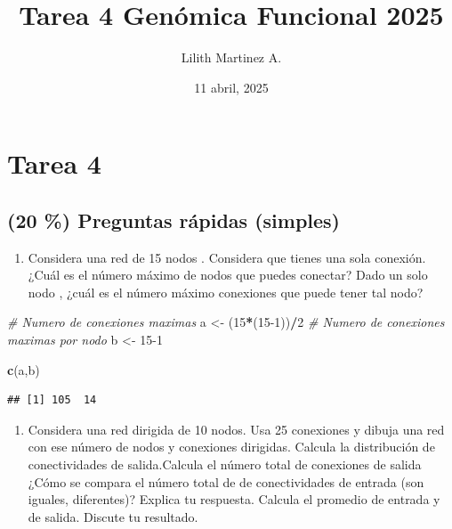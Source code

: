 \documentclass[
]{article}
\title{Tarea 4 Genómica Funcional 2025}
\author{Lilith Martinez A.}
\date{11 abril, 2025}
\newenvironment{Shaded}{\begin{snugshade}}{\end{snugshade}}
\newcommand{\CommentTok}[1]{\textcolor[rgb]{0.56,0.35,0.01}{\textit{#1}}}
\newcommand{\DecValTok}[1]{\textcolor[rgb]{0.00,0.00,0.81}{#1}}
\newcommand{\FunctionTok}[1]{\textcolor[rgb]{0.13,0.29,0.53}{\textbf{#1}}}
\newcommand{\NormalTok}[1]{#1}
\newcommand{\OtherTok}[1]{\textcolor[rgb]{0.56,0.35,0.01}{#1}}
\newcommand{\SpecialCharTok}[1]{\textcolor[rgb]{0.81,0.36,0.00}{\textbf{#1}}}
\providecommand{\tightlist}{%
  \setlength{\itemsep}{0pt}\setlength{\parskip}{0pt}}
\begin{document}
\maketitle

{
\setcounter{tocdepth}{2}
\tableofcontents
}
\section{Tarea 4}\label{tarea-4}

\subsection{(20 \%) Preguntas rápidas
(simples)}\label{preguntas-ruxe1pidas-simples}

\begin{enumerate}
\def\labelenumi{\arabic{enumi}.}
\tightlist
\item
  Considera una red de 15 nodos . Considera que tienes una sola
  conexión. ¿Cuál es el número máximo de nodos que puedes conectar? Dado
  un solo nodo , ¿cuál es el número máximo conexiones que puede tener
  tal nodo?
\end{enumerate}

\begin{Shaded}
\begin{Highlighting}[]
\CommentTok{\# Numero de conexiones maximas}
\NormalTok{a }\OtherTok{\textless{}{-}}\NormalTok{ (}\DecValTok{15}\SpecialCharTok{*}\NormalTok{(}\DecValTok{15{-}1}\NormalTok{))}\SpecialCharTok{/}\DecValTok{2}
\CommentTok{\# Numero de conexiones maximas por nodo}
\NormalTok{b }\OtherTok{\textless{}{-}} \DecValTok{15{-}1}

\FunctionTok{c}\NormalTok{(a,b)}
\end{Highlighting}
\end{Shaded}

\begin{verbatim}
## [1] 105  14
\end{verbatim}

\begin{enumerate}
\def\labelenumi{\arabic{enumi}.}
\setcounter{enumi}{1}
\tightlist
\item
  Considera una red dirigida de 10 nodos. Usa 25 conexiones y dibuja una
  red con ese número de nodos y conexiones dirigidas. Calcula la
  distribución de conectividades de salida.Calcula el número total de
  conexiones de salida ¿Cómo se compara el número total de de
  conectividades de entrada (son iguales, diferentes)? Explica tu
  respuesta. Calcula el promedio de entrada y de salida. Discute tu
  resultado.
\end{enumerate}
\end{document}
